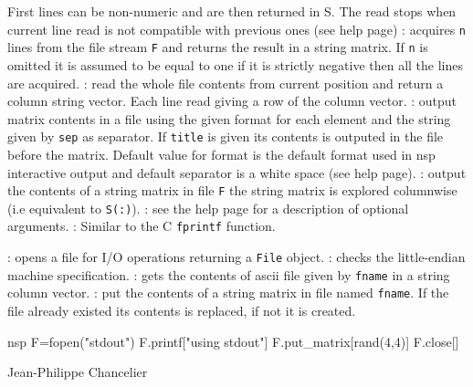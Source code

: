 \begin{itemize}
  First lines can be non-numeric and are then returned in S. The read stops when current 
  line read is not compatible with previous ones (see   help page)
  : acquires \verb+n+ lines from the file stream \verb+F+ and returns 
  the result in a string matrix. If \verb+n+ is omitted it is assumed to be equal to 
  one if it is strictly negative then all the lines are acquired.
  : read the whole file contents from current position
  and return a column string vector. Each line read giving a row of the column vector.
  : 
    output  matrix contents in a file using the given format for each element 
    and the string given by \verb+sep+ as separator. If \verb+title+ is given 
    its contents is outputed in the file before the matrix. Default value 
    for format is the default format used in nsp interactive output and default 
    separator is a white space (see   help page).  
  : output the contents of a string matrix in file \verb+F+ 
  the string matrix is explored columnwise (i.e equivalent to \verb+S(:)+).
  : 
  see the  help page for a description of optional arguments.
  : Similar to the C \verb+fprintf+ function. 
\end{itemize}

\begin{itemize}
  : opens a file for I/O operations returning a \verb+File+ object.
  : checks the little-endian machine specification.
  : gets the contents of ascii file given by \verb+fname+ 
  in a string column vector.
  : put the contents of a string matrix in file named 
  \verb+fname+. If the file already existed its contents is replaced, if not it is 
  created. 
\end{itemize}

\begin{examples}
\begin{mintednsp}{nsp}
F=fopen("stdout")
F.printf["using stdout"]
F.put_matrix[rand(4,4)]
F.close[]
\end{mintednsp}
\end{examples}

\begin{manseealso}
\end{manseealso}

\begin{authors}
  Jean-Philippe Chancelier 
\end{authors}

